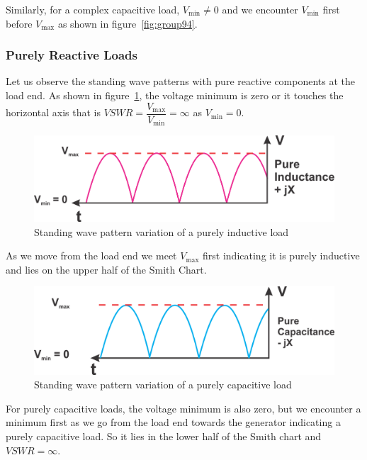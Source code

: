 Similarly, for a complex capacitive load, $V_\min\neq0$ and we encounter $V_\min$ first before $V_\max$ as shown in figure~\ref{fig:group94}. 

\subsubsection{Purely Reactive Loads}
Let us observe the standing wave patterns with pure reactive components at the load end. As shown in figure~\ref{fig:group96}, the voltage minimum is zero or it touches the horizontal axis that is ${VSWR=\dfrac{V_\max}{V_\min}=\infty}$ as ${V_\min=0}$.
\begin{figure}[h]
\centering
\includegraphics[scale=0.5]{./graphics/Group96}
\caption{Standing wave pattern variation of a purely inductive load}
\label{fig:group96}
\end{figure}

As we move from the load end we meet ${V_\max}$ first indicating it is purely inductive and lies on the upper half of the Smith Chart.
\begin{figure}[h]
\centering
\includegraphics[scale=0.5]{./graphics/Group97}
\caption{Standing wave pattern variation of a purely capacitive load}
\label{fig:group97}
\end{figure}

For purely capacitive loads, the voltage minimum is also zero, but we encounter a minimum first as we go from the load end towards the generator indicating a purely capacitive load. So it lies in the lower half of the Smith chart and $VSWR=\infty$.


